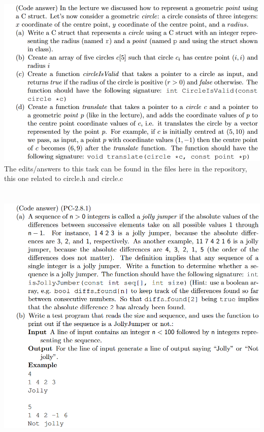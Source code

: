 \documentclass{article}
\begin{document}
\section{}
\includegraphics[width=\linewidth, keepaspectratio=true]{task6}
\vspace{2pt}\\
The edits/answers to this task can be found in the files here in the repository, this one related to circle.h and circle.c


\section{}
\includegraphics[width=\linewidth, keepaspectratio=true]{task7}
\vspace{2pt}\\
\end{document}
